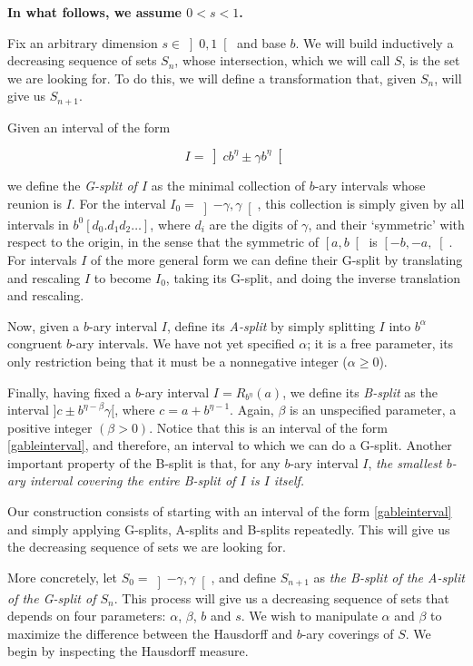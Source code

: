 \documentclass[11pt, reqno]{amsart}
\begin{document}
\textbf{In what follows, we assume $0 < s < 1$.}

Fix an arbitrary dimension $s \in \left]0, 1 \right[$ and base $b$. We will build inductively a decreasing sequence of sets $S_n$, whose intersection, which we will call $S$, is the set we are looking for. To do this, we will define a transformation that, given $S_n$, will give us $S_{n+1}$.

Given an interval of the form

\begin{equation}\label{gableinterval}
I = \left] c b^\eta \pm \gamma b^\eta \right[
\end{equation}

we define the \emph{G-split of $I$} as the minimal collection of $b$-ary intervals whose reunion is $I$. For the interval $I_0 = \left]-\gamma, \gamma\right[$, this collection is simply given by all intervals in $b^0 [ d_0 . d_1 d_2 \dots ]$, where $d_i$ are the digits of $\gamma$, and their `symmetric' with respect to the origin, in the sense that the symmetric of $\left[a,b\right[$ is $\left[-b,-a,\right[$. For intervals $I$ of the more general form we can define their G-split by translating and rescaling $I$ to become $I_0$, taking its G-split, and doing the inverse translation and rescaling.

Now, given a $b$-ary interval $I$, define its \emph{A-split} by simply splitting $I$ into $b^\alpha$ congruent $b$-ary intervals. We have not yet specified $\alpha$; it is a free parameter, its only restriction being that it must be a nonnegative integer ($\alpha \geq 0$).

Finally, having fixed a $b$-ary interval $I = R_{b^\eta}(a)$, we define its \emph{B-split} as the interval $]c \pm b^{\eta - \beta} \gamma[$, where $c = a + b^{\eta - 1}$. Again, $\beta$ is an unspecified parameter, a positive integer $(\beta > 0)$. Notice that this is an interval of the form \eqref{gableinterval}, and therefore, an interval to which we can do a G-split. Another important property of the B-split is that, for any $b$-ary interval $I$, \emph{the smallest $b$-ary interval covering the entire B-split of $I$ is $I$ itself.}

Our construction consists of starting with an interval of the form \eqref{gableinterval} and simply applying G-splits, A-splits and B-splits repeatedly. This will give us the decreasing sequence of sets we are looking for.

More concretely, let $S_0 = \left]-\gamma, \gamma\right[$, and define $S_{n+1}$ as \emph{the B-split of the A-split of the G-split of $S_n$}. This process will give us a decreasing sequence of sets that depends on four parameters: $\alpha$, $\beta$, $b$ and $s$. We wish to manipulate $\alpha$ and $\beta$ to maximize the difference between the Hausdorff and $b$-ary coverings of $S$. We begin by inspecting the Hausdorff measure.
\end{document}
